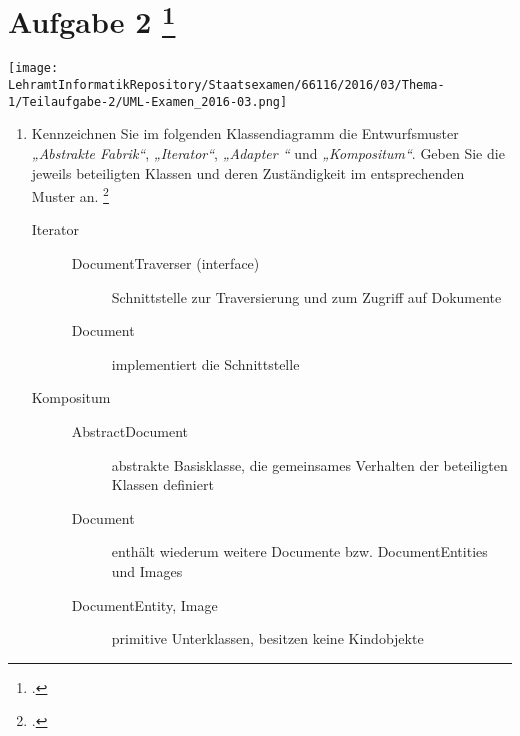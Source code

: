 \documentclass{lehramt-informatik-minimal}
\begin{document}
\section{Aufgabe 2
\footcite[Thema 1 Teilaufgabe 2 Aufgabe 2]{examen:66116:2016:03}
}

\texttt{[image: \\LehramtInformatikRepository/Staatsexamen/66116/2016/03/Thema-1/Teilaufgabe-2/UML-Examen\_2016-03.png]}

\begin{enumerate}


\item Kennzeichnen Sie im folgenden
Klassendiagramm die Entwurfsmuster
\emph{„Abstrakte Fabrik“},
\emph{„Iterator“}, \emph{„Adapter
“} und \emph{„Kompositum“}.
Geben Sie die jeweils beteiligten Klassen und deren Zuständigkeit im
entsprechenden Muster an.
\footcite{sosy:ab:6}

\begin{antwort}

\begin{description}

%

\item[Iterator] \strut

\begin{description}
\item[DocumentTraverser (interface)]
Schnittstelle zur Traversierung und zum Zugriff auf Dokumente

\item[Document]
implementiert die Schnittstelle
\end{description}

%

\item[Kompositum] \strut

\begin{description}
\item[AbstractDocument]
abstrakte Basisklasse, die gemeinsames Verhalten der beteiligten
Klassen definiert

\item[Document]
enthält wiederum weitere Documente bzw. DocumentEntities und Images

\item[DocumentEntity, Image]
primitive Unterklassen, besitzen keine Kindobjekte
\end{description}


\end{description}
\end{antwort}
\end{enumerate}
\end{document}
